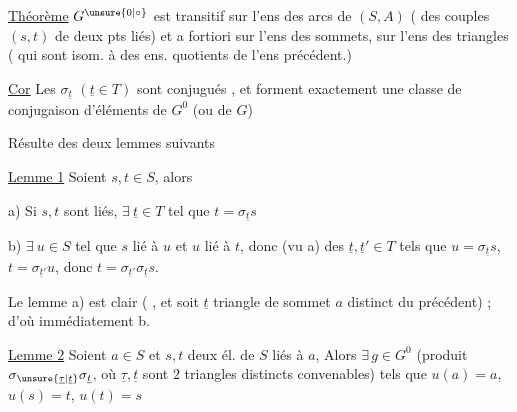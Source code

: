 \uline{Théorème} $G^{\unsure{0|\circ}}$ est transitif sur l'ens des arcs de $(S,A)$ ( des couples $(s,t)$ de deux pts liés) et a fortiori sur l'ens des sommets,   sur l'ens des triangles ( qui sont isom. à des ens. quotients de l'ens précédent.)


\uline{Cor} Les $\sigma_{\underline t}$ $(\underline t\in T)$ sont conjugués , et forment exactement une classe de conjugaison d'éléments de $G^0$ (ou de $G$)

Résulte des deux lemmes suivants

\uline{Lemme 1} Soient $s,t\in S$, alors

a) Si $s,t$ sont liés, $\exists\ \underline t\in T$ tel que $t=\sigma_{\underline t}s$

b)   $\exists\ u\in S$ tel que $s$ lié à $u$ et $u$ lié à $t$, donc (vu a) des $\underline t,\underline t'\in T$ tels que $u=\sigma_{\underline t}s$, $t=\sigma_{\underline t'}u$, donc $t=\sigma_{\underline t'}\sigma_{\underline t}s$.

Le lemme a) est clair ( ,  et soit $\underline t$  triangle de sommet $a$ distinct du précédent) ; d'où immédiatement b.

\uline{Lemme 2}  Soient $a\in S$ et $s,t$ deux él. de $S$ liés à $a$,  Alors $\exists\,g\in G^0$ (produit  $\sigma_{\unsure{\underline\tau|\underline t}} \sigma_{\underline t}$, où $\underline\tau,\underline t$ sont $2$ triangles distincts convenables) tels que $u(a)=a$, $u(s)=t$, $u(t)=s$

